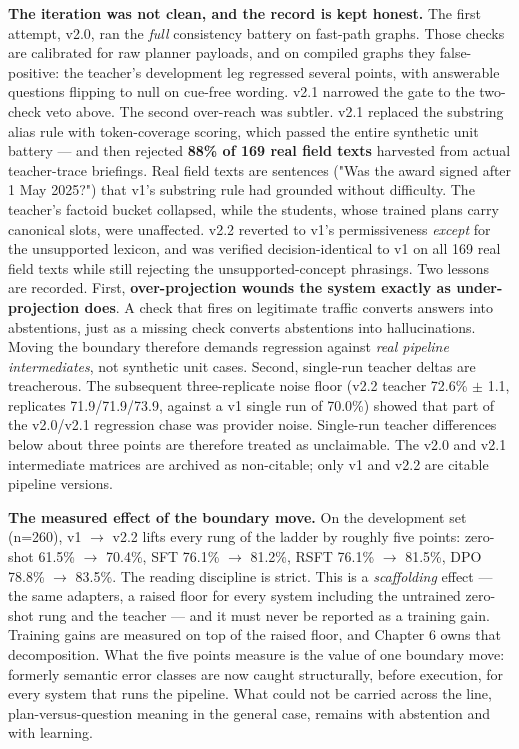 \textbf{The iteration was not clean, and the record is kept honest.} The first attempt, v2.0, ran the \emph{full} consistency battery on fast-path graphs. Those checks are calibrated for raw planner payloads, and on compiled graphs they false-positive: the teacher's development leg regressed several points, with answerable questions flipping to null on cue-free wording. v2.1 narrowed the gate to the two-check veto above. The second over-reach was subtler. v2.1 replaced the substring alias rule with token-coverage scoring, which passed the entire synthetic unit battery --- and then rejected \textbf{88\% of 169 real field texts} harvested from actual teacher-trace briefings. Real field texts are sentences ("Was the award signed after 1 May 2025?") that v1's substring rule had grounded without difficulty. The teacher's factoid bucket collapsed, while the students, whose trained plans carry canonical slots, were unaffected. v2.2 reverted to v1's permissiveness \emph{except} for the unsupported lexicon, and was verified decision-identical to v1 on all 169 real field texts while still rejecting the unsupported-concept phrasings. Two lessons are recorded. First, \textbf{over-projection wounds the system exactly as under-projection does}. A check that fires on legitimate traffic converts answers into abstentions, just as a missing check converts abstentions into hallucinations. Moving the boundary therefore demands regression against \emph{real pipeline intermediates}, not synthetic unit cases. Second, single-run teacher deltas are treacherous. The subsequent three-replicate noise floor (v2.2 teacher 72.6\% $\pm$ 1.1, replicates 71.9/71.9/73.9, against a v1 single run of 70.0\%) showed that part of the v2.0/v2.1 regression chase was provider noise. Single-run teacher differences below about three points are therefore treated as unclaimable. The v2.0 and v2.1 intermediate matrices are archived as non-citable; only v1 and v2.2 are citable pipeline versions.

\textbf{The measured effect of the boundary move.} On the development set (n=260), v1 $\rightarrow$ v2.2 lifts every rung of the ladder by roughly five points: zero-shot 61.5\% $\rightarrow$ 70.4\%, SFT 76.1\% $\rightarrow$ 81.2\%, RSFT 76.1\% $\rightarrow$ 81.5\%, DPO 78.8\% $\rightarrow$ 83.5\%. The reading discipline is strict. This is a \emph{scaffolding} effect --- the same adapters, a raised floor for every system including the untrained zero-shot rung and the teacher --- and it must never be reported as a training gain. Training gains are measured on top of the raised floor, and Chapter 6 owns that decomposition. What the five points measure is the value of one boundary move: formerly semantic error classes are now caught structurally, before execution, for every system that runs the pipeline. What could not be carried across the line, plan-versus-question meaning in the general case, remains with abstention and with learning.

